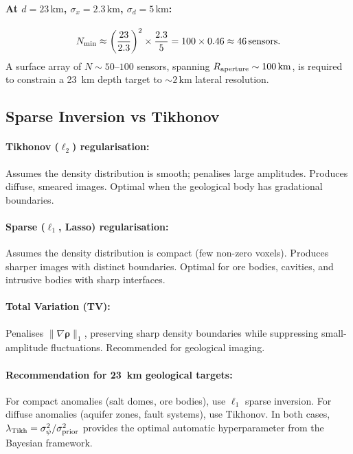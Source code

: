 \documentclass[aps,prd,twocolumn,superscriptaddress,nofootinbib]{revtex4-2}
\newcommand{\km}{\,\mathrm{km}}
\begin{document}
\paragraph{At $d = 23\km$, $\sigma_x = 2.3\km$, $\sigma_d = 5\km$:}
\begin{equation}
  N_{\rm min} \approx \left(\frac{23}{2.3}\right)^2 \times
  \frac{2.3}{5} = 100 \times 0.46 \approx 46\,\text{sensors}.
  \label{eq:sensor-count-23}
\end{equation}
A surface array of $N \sim 50$--$100$ sensors, spanning
$R_{\rm aperture} \sim 100\km$, is required to constrain a
23~km depth target to $\sim 2\km$ lateral resolution.

\subsection{Sparse Inversion vs Tikhonov}

\paragraph{Tikhonov ($\ell_2$) regularisation:} Assumes the density
distribution is smooth; penalises large amplitudes.  Produces
diffuse, smeared images.  Optimal when the geological body has
gradational boundaries.

\paragraph{Sparse ($\ell_1$, Lasso) regularisation:} Assumes the
density distribution is compact (few non-zero voxels).  Produces
sharper images with distinct boundaries.  Optimal for ore bodies,
cavities, and intrusive bodies with sharp interfaces.

\paragraph{Total Variation (TV):} Penalises $\|\nabla\boldsymbol{\rho}\|_1$,
preserving sharp density boundaries while suppressing small-amplitude
fluctuations.  Recommended for geological imaging.

\paragraph{Recommendation for 23~km geological targets:}
For compact anomalies (salt domes, ore bodies), use $\ell_1$ sparse
inversion.  For diffuse anomalies (aquifer zones, fault systems),
use Tikhonov.  In both cases, $\lambda_{\rm Tikh} = \sigma_\psi^2/\sigma_{\rm prior}^2$
provides the optimal automatic hyperparameter from the Bayesian
framework.
\end{document}
